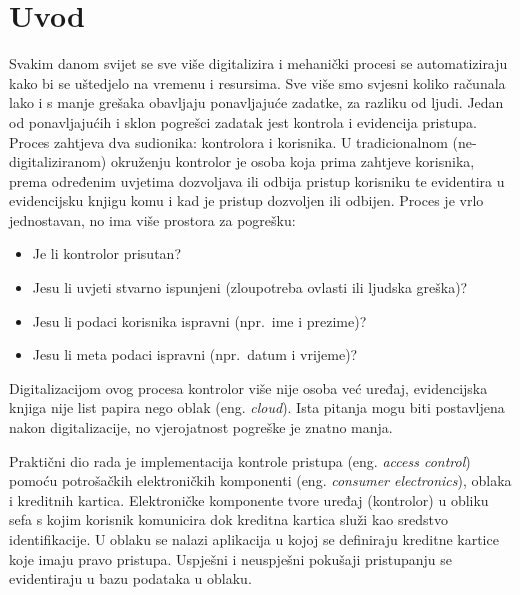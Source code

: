 \chapter{Uvod}

Svakim danom svijet se sve više digitalizira i mehanički procesi se automatiziraju kako bi se uštedjelo na vremenu i resursima.
Sve više smo svjesni koliko računala lako i s manje grešaka obavljaju ponavljajuće zadatke, za razliku od ljudi.
Jedan od ponavljajućih i sklon pogrešci zadatak jest kontrola i evidencija pristupa.
Proces zahtjeva dva sudionika: kontrolora i korisnika.
U tradicionalnom (ne-digitaliziranom) okruženju kontrolor je osoba koja prima zahtjeve korisnika, prema određenim uvjetima
dozvoljava ili odbija pristup korisniku te evidentira u evidencijsku knjigu komu i kad je pristup dozvoljen ili odbijen.
Proces je vrlo jednostavan, no ima više prostora za pogrešku:
\begin{itemize}
    \item Je li kontrolor prisutan?
    \item Jesu li uvjeti stvarno ispunjeni (zloupotreba ovlasti ili ljudska greška)?
    \item Jesu li podaci korisnika ispravni (npr.\ ime i prezime)?
    \item Jesu li meta podaci ispravni (npr.\ datum i vrijeme)?
\end{itemize}
Digitalizacijom ovog procesa kontrolor više nije osoba već uređaj, evidencijska knjiga nije list papira nego oblak (eng. \textit{cloud}).
Ista pitanja mogu biti postavljena nakon digitalizacije, no vjerojatnost pogreške je znatno manja.

Praktični dio rada je implementacija kontrole pristupa (eng. \textit{access control}) pomoću potrošačkih elektroničkih
komponenti (eng. \textit{consumer electronics}), oblaka i kreditnih kartica.
Elektroničke komponente tvore uređaj (kontrolor) u obliku sefa s kojim korisnik komunicira dok kreditna kartica služi kao sredstvo identifikacije.
U oblaku se nalazi aplikacija u kojoj se definiraju kreditne kartice koje imaju pravo pristupa.
Uspješni i neuspješni pokušaji pristupanju se evidentiraju u bazu podataka u oblaku.
